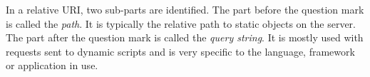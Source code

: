 In a relative URI, two sub-parts are identified. The part before the question
mark is called the \emph{path}. It is typically the relative path to static objects
on the server. The part after the question mark is called the \emph{query string}.
It is mostly used with  requests sent to dynamic scripts and is very
specific to the language, framework or application in use.



